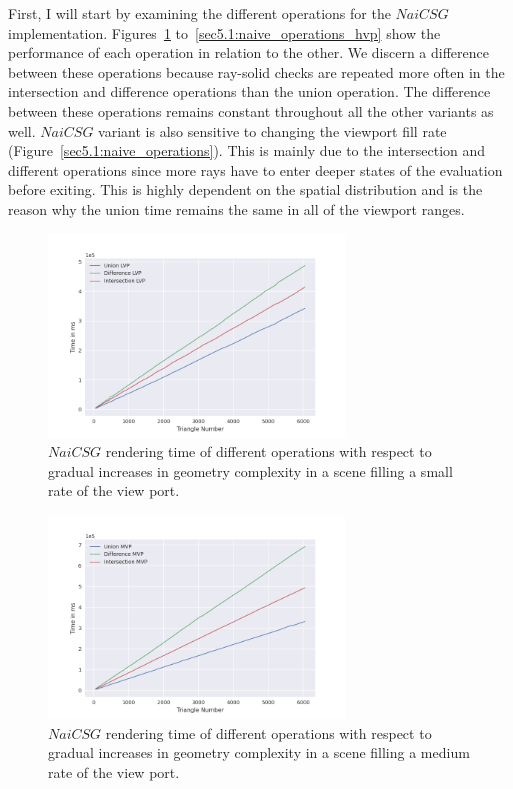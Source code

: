 \documentclass[a4paper,11pt,oneside]{article}
\begin{document}
First, I will start by examining the different operations for the $NaiCSG$ implementation. Figures~\ref{sec5.1:naive_operations_lvp} to~\ref{sec5.1:naive_operations_hvp} show the performance of each operation in relation to the other. We discern a difference between these operations because ray-solid checks are repeated more often in the intersection and difference operations than the union operation. The difference between these operations remains constant throughout all the other variants as well. $NaiCSG$ variant is also sensitive to changing the viewport fill rate (Figure~\ref{sec5.1:naive_operations}). This is mainly due to the intersection and different operations since more rays have to enter deeper states of the evaluation before exiting. This is highly dependent on the spatial distribution and is the reason why the union time remains the same in all of the viewport ranges.


\begin{figure}[H]
	\centering
	\includegraphics[width=0.7\textwidth]{section5/plots/naive_csg_lvp.png}
	\caption{$NaiCSG$ rendering time of different operations with respect to gradual increases in geometry complexity in a scene filling a small rate of the view port.}
	\label{sec5.1:naive_operations_lvp}
\end{figure}

\begin{figure}[H]
	\centering
	\includegraphics[width=0.7\textwidth]{section5/plots/naive_csg_mvp.png}
	\caption{$NaiCSG$ rendering time of different operations with respect to gradual increases in geometry complexity in a scene filling a medium rate of the view port.}
	\label{sec5.1:naive_operations_mvp}
\end{figure}
\end{document}
